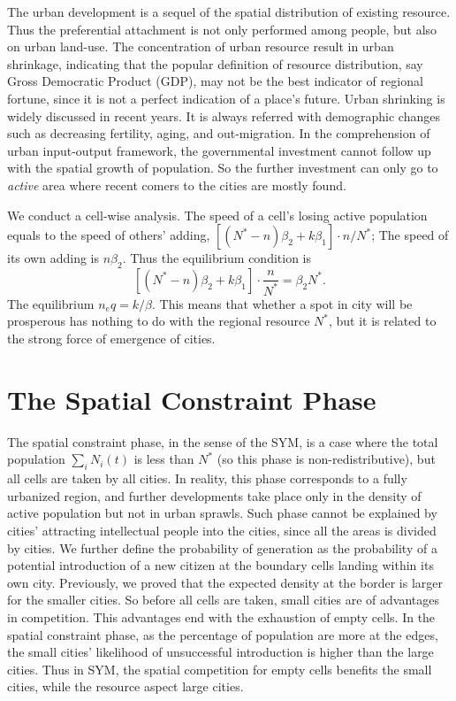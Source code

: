 \documentclass[aps,prl]{revtex4-2}
\begin{document}
The urban development is a sequel of the spatial distribution of existing resource. Thus the preferential attachment is not only performed among people, but also on urban land-use. The concentration of urban resource result in urban shrinkage, indicating that the popular definition of resource distribution, say Gross Democratic Product (GDP), may not be the best indicator of regional fortune, since it is not a perfect indication of a place's future. Urban shrinking is widely discussed in recent years. It is always referred with demographic changes such as decreasing fertility, aging, and out-migration\cite{haase2008urban}. In the comprehension of urban input-output framework, the governmental investment cannot follow up with the spatial growth of population. So the further investment can only go to \emph{active} area where recent comers to the cities are mostly found. 

We conduct a cell-wise analysis. The speed of a cell's losing active population equals to the speed of others' adding, $[(N^*-n)\beta_2 +k \beta_1]\cdot n/N^*$; The speed of its own adding is $n\beta_2$. Thus the equilibrium condition is \[ [(N^*-n)\beta_2+k\beta_1]\cdot \frac{n}{N^*} = \beta_2N^*. \] The equilibrium $n_eq = k/\beta$. This means that whether a spot in city will be prosperous  has nothing to do with the regional resource $N^*$, but it is related to the strong force of emergence of cities.

\section{The Spatial Constraint Phase}

The spatial constraint phase, in the sense of the SYM, is a case where the total population $\sum_i N_i(t)$ is less than $N^*$ (so this phase is non-redistributive), but all cells are taken by all cities. In reality, this phase corresponds to a fully urbanized region, and further developments take place only in the density of active population but not in urban sprawls. Such phase cannot be explained by cities' attracting intellectual people into the cities, since all the areas is divided by cities. We further define the probability of generation as the probability of a potential introduction of a new citizen at the boundary cells landing within its own city. Previously, we proved that the expected density at the border is larger for the smaller cities. So before all cells are taken, small cities are of advantages in competition. This advantages end with the exhaustion of empty cells. In the spatial constraint phase, as the percentage of population are more at the edges, the small cities' likelihood of unsuccessful introduction is higher than the large cities. Thus in SYM, the spatial competition for empty cells benefits the small cities, while the resource aspect large cities.




\end{document}

